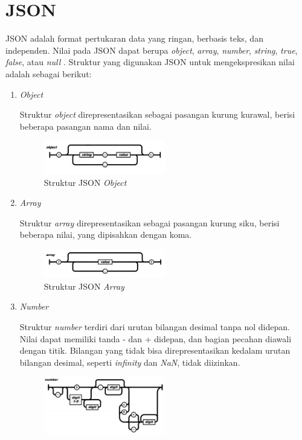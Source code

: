 \section{JSON}
\par JSON adalah format pertukaran data yang ringan, berbasis teks, dan independen. Nilai pada JSON dapat berupa \textit{object}, \textit{array}, \textit{number}, \textit{string}, \textit{true}, \textit{false}, atau \textit{null} \cite{json-online}. Struktur yang digunakan JSON untuk mengekspresikan nilai adalah sebagai berikut:
\begin{enumerate}
	\item \textit{Object}
	\par Struktur \textit{object} direpresentasikan sebagai pasangan kurung kurawal, berisi beberapa pasangan nama dan nilai.
	\begin{figure}[H]
		\centering\includegraphics[width=0.5\textwidth]{bab2/img/json_object.jpg}
		\caption{Struktur JSON \textit{Object}}
	\end{figure}
	\item \textit{Array}
	\par Struktur \textit{array} direpresentasikan sebagai pasangan kurung siku, berisi beberapa nilai, yang dipisahkan dengan koma.
	\begin{figure}[H]
		\centering\includegraphics[width=0.5\textwidth]{bab2/img/json_array.jpg}
		\caption{Struktur JSON \textit{Array}}
	\end{figure}
	\item \textit{Number}
	\par Struktur \textit{number} terdiri dari urutan bilangan desimal tanpa nol didepan. Nilai dapat memiliki tanda - dan + didepan, dan bagian pecahan diawali dengan titik. Bilangan yang tidak bisa direpresentasikan kedalam urutan bilangan desimal, seperti \textit{infinity} dan \textit{NaN}, tidak diizinkan.
	\begin{figure}[H]
		\centering\includegraphics[width=0.5\textwidth]{bab2/img/json_number.jpg}

\end{figure}
\end{enumerate}
